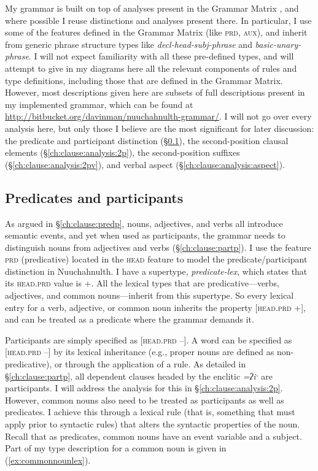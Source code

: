 My grammar is built on top of analyses present in the Grammar Matrix \citep{bender2002}, and where possible I reuse distinctions and analyses present there. In particular, I use some of the features defined in the Grammar Matrix (like \textsc{prd}, \textsc{aux}), and inherit from generic phrase structure types like \textit{decl-head-subj-phrase} and \textit{basic-unary-phrase}. I will not expect familiarity with all these pre-defined types, and will attempt to give in my diagrams here all the relevant components of rules and type definitions, including those that are defined in the Grammar Matrix. However, most descriptions given here are subsets of full descriptions present in my implemented grammar, which can be found at \url{http://bitbucket.org/davinman/nuuchahnulth-grammar/}. I will not go over every analysis here, but only those I believe are the most significant for later discussion: the predicate and participant distinction (\S\ref{ch:clause:analysis:predpart}), the second-position clausal elements (\S\ref{ch:clause:analysis:2p}), the second-position suffixes (\S\ref{ch:clause:analysis:2pv}), and verbal aspect (\S\ref{ch:clause:analysis:aspect}).

\subsection{Predicates and participants} \label{ch:clause:analysis:predpart}

As argued in \S\ref{ch:clause:predp}, nouns, adjectives, and verbs all introduce semantic events, and yet when used as participants, the grammar needs to distinguish nouns from adjectives and verbs (\S\ref{ch:clause:partp}). I use the feature \textsc{prd} (predicative) located in the \textsc{head} feature to model the predicate/participant distinction in Nuuchahnulth. I have a supertype, \textit{predicate-lex}, which states that its \textsc{head.prd} value is +. All the lexical types that are predicative---verbs, adjectives, and common nouns---inherit from this supertype. So every lexical entry for a verb, adjective, or common noun inherits the property [\textsc{head.prd} +], and can be treated as a predicate where the grammar demands it.

Participants are simply specified as [\textsc{head.prd} --]. A word can be specified as [\textsc{head.prd} --] by its lexical inheritance (e.g., proper nouns are defined as non-predicative), or through the application of a rule. As detailed in \S\ref{ch:clause:partp}, all dependent clauses headed by the enclitic \textit{=ʔiˑ} are participants. I will address the analysis for this in \S\ref{ch:clause:analysis:2p}. However, common nouns also need to be treated as participants as well as predicates. I achieve this through a lexical rule (that is, something that must apply prior to syntactic rules) that alters the syntactic properties of the noun. Recall that as predicates, common nouns have an event variable and a subject. Part of my type description for a common noun is given in (\ref{ex:commonnounlex}).

